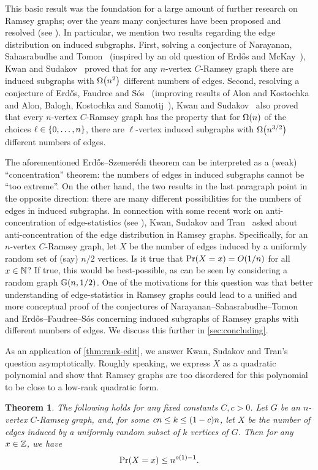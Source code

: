 \documentclass{daj}
\theoremstyle{plain}
\newtheorem{thm}{Theorem}[section]
\theoremstyle{plain}
\theoremstyle{plain}
\theoremstyle{plain}
\theoremstyle{definition}
\theoremstyle{plain}
\theoremstyle{plain}
\theoremstyle{definition}
\theoremstyle{definition}
\theoremstyle{plain}
\let\originalleft\left
\let\originalright\right
\renewcommand{\left}{\mathopen{}\mathclose\bgroup\originalleft}
\renewcommand{\right}{\aftergroup\egroup\originalright}
\begin{document}
This basic result was the foundation for a large amount of further
research on Ramsey graphs; over the years many conjectures have been proposed and resolved (see \cite{ABKS09,AK09,AKS03,BS07,Erd92,Erd97,EH77,KS17,KS17a,NST16,PR99,She98}).
In particular, we mention two results regarding the edge distribution
on induced subgraphs. First, solving a conjecture of Narayanan, Sahasrabudhe
and Tomon~\cite{NST16} (inspired by an old question of Erd\H os
and McKay~\cite{Erd92,Erd97}), Kwan and Sudakov~\cite{KS17a} proved
that for any $n$-vertex $C$-Ramsey graph there are
induced subgraphs with $\Omega\left(n^{2}\right)$ different numbers
of edges. Second, resolving a conjecture of Erd\H os, Faudree and
S\'os~\cite{Erd92,Erd97} (improving results of Alon and Kostochka~\cite{AK09}
and Alon, Balogh, Kostochka and Samotij~\cite{ABKS09}), Kwan and
Sudakov~\cite{KS17} also proved that every $n$-vertex $C$-Ramsey
graph has the property that for $\Omega\left(n\right)$ of the choices
$\ell\in\left\{ 0,\dots,n\right\} $, there are $\ell$-vertex induced
subgraphs with $\Omega\left(n^{3/2}\right)$ different numbers of
edges.

The aforementioned Erd\H os--Szemer\'edi theorem can be interpreted
as a (weak) ``concentration'' theorem: the numbers of edges in induced
subgraphs cannot be ``too extreme''. On the other hand, the two
results in the last paragraph point in the opposite direction: there
are many different possibilities for the numbers of edges in induced
subgraphs. In connection with some recent work on anti-concentration
of edge-statistics (see \cite{AHKT,FS,KST,MMNT}), Kwan, Sudakov and
Tran~\cite{KST} asked about anti-concentration of the edge distribution
in Ramsey graphs. Specifically, for an $n$-vertex $C$-Ramsey graph, let $X$ be the number of edges induced by a uniformly random set of (say) $n/2$ vertices. Is it true that $\Pr\left(X=x\right)=O\left(1/n\right)$
for all $x\in\mathbb{N}$? If true, this would be best-possible, as can be
seen by considering a random graph $\GG\left(n,1/2\right)$. One of the motivations for this question was that better understanding of edge-statistics in Ramsey graphs could lead to a unified and more conceptual proof of the conjectures of Narayanan--Sahasrabudhe--Tomon and Erd\H os--Faudree--S\'os concerning induced subgraphs of Ramsey graphs with different numbers of edges. We discuss this further in \cref{sec:concluding}.

As an application of \cref{thm:rank-edit},
we answer Kwan, Sudakov and Tran's question asymptotically. Roughly speaking, we express
$X$ as a quadratic polynomial and show that Ramsey graphs are too
disordered for this polynomial to be close to a low-rank quadratic form.
\begin{thm}
\label{thm:ramsey-KST}The following holds for any fixed constants $C,c>0$. Let $G$ be an $n$-vertex $C$-Ramsey graph, and, for some $cn\le k\le\left(1-c\right)n$, let $X$ be the
number of edges induced by a uniformly random subset of $k$ vertices
of $G$. Then for any $x\in\mathbb{Z}$,
we have
\[
\Pr\left(X=x\right)\le n^{o\left(1\right)-1}.
\]
\end{thm}
\end{document}
